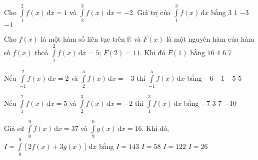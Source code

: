 \begin{ex}%
	Cho $\displaystyle\int\limits_1^2 f(x)\mathrm{\,d}x = 1$ và $\displaystyle\int\limits_2^3 f(x)\mathrm{\,d}x = -2$. Giá trị của $\displaystyle\int\limits_1^3 f(x)\mathrm{\,d}x$ bằng
	\choice
	{$3$}
	{$1$}
	{$-3$}
	{\True $-1$}
\end{ex}
\begin{ex}%
	Cho $f(x)$ là một hàm số liên tục trên $\mathbb{R}$ và $F(x)$ là một nguyên hàm của hàm số $f(x)$ thoả $\displaystyle\int\limits_1^2 f(x)\mathrm{\,d}x = 5$; $F(2) = 11$. Khi đó $F(1)$ bằng
	\choice
	{$16$}
	{$4$}
	{\True $6$}
	{$7$}
\end{ex}
\begin{ex}%
	Nếu $\displaystyle\int\limits_{-1}^2 f(x)\mathrm{\,d}x = 2$ và $\displaystyle\int\limits_2^5 f(x)\mathrm{\,d}x = -3$ thi $\displaystyle\int\limits_{-1}^5 f(x)\mathrm{\,d}x$ bằng
	\choice
	{$-6$}
	{\True $-1$}
	{$-5$}
	{$5$}
\end{ex}
\begin{ex}%
	Nếu $\displaystyle\int\limits_1^2 f(x)\mathrm{\,d}x = 5$ và $\displaystyle\int\limits_2^3 f(x)\mathrm{\,d}x = -2$ thì $\displaystyle\int\limits_1^3 f(x)\mathrm{\,d}x$ bằng
	\choice
	{$-7$}
	{\True $3$}
	{$7$}
	{$-10$}
\end{ex}
\begin{ex}%
	Giả sử $\displaystyle\int\limits_0^9 f(x)\mathrm{\,d}x = 37$ và $\displaystyle\int\limits_9^0 g(x)\mathrm{\,d}x = 16$. Khi đó, $I = \displaystyle\int\limits_0^9 \left[2f(x) + 3g(x)\right]\mathrm{\,d}x$ bằng
	\choice
	{$I=143$}
	{$I=58$}
	{$I=122$}
	{\True $I=26$}
\end{ex}

